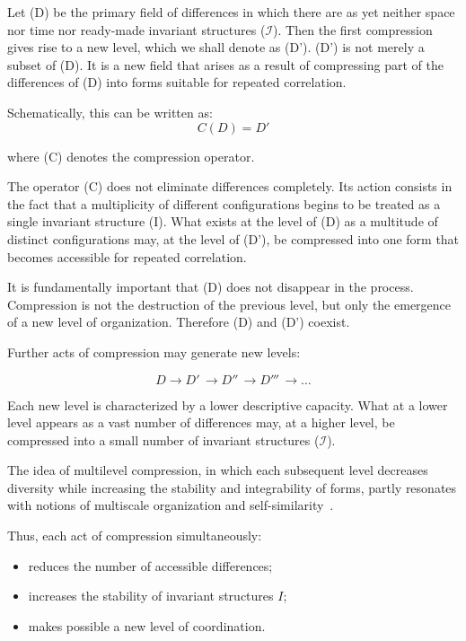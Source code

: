 \documentclass[aps,prd,onecolumn,nofootinbib,superscriptaddress]{revtex4-2} %
\begin{document}
    Let (D) be the primary field of differences in which there are as yet neither space nor time nor ready-made invariant structures ($\mathcal{I}$). Then the first compression gives rise to a new level, which we shall denote as (D'). (D') is not merely a subset of (D). It is a new field that arises as a result of compressing part of the differences of (D) into forms suitable for repeated correlation.

    Schematically, this can be written as:
    \[C(D)=D'\]

    where (C) denotes the compression operator.

    The operator (C) does not eliminate differences completely. Its action consists in the fact that a multiplicity of different configurations begins to be treated as a single invariant structure (I). What exists at the level of (D) as a multitude of distinct configurations may, at the level of (D'), be compressed into one form that becomes accessible for repeated correlation.

    It is fundamentally important that (D) does not disappear in the process. Compression is not the destruction of the previous level, but only the emergence of a new level of organization. Therefore (D) and (D') coexist.

    Further acts of compression may generate new levels:

    \[ D \to D'\, \to D''\, \to D'''\, \to \dots \]

    Each new level is characterized by a lower descriptive capacity. What at a lower level appears as a vast number of differences may, at a higher level, be compressed into a small number of invariant structures ($\mathcal{I}$).

    The idea of multilevel compression, in which each subsequent level decreases diversity while increasing the stability and integrability of forms, partly resonates with notions of multiscale organization and self-similarity~\cite{Mandelbrot1982,Mandelbrot1977}.

    Thus, each act of compression simultaneously:
    \begin{itemize}
        \item reduces the number of accessible differences;
        \item increases the stability of invariant structures \(I\);
        \item makes possible a new level of coordination.
    \end{itemize}
\end{document}

